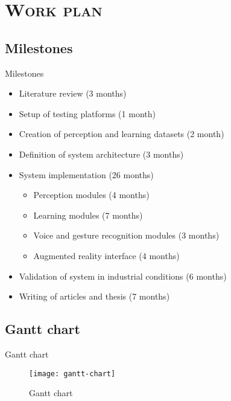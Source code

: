 \section{\scshape Work plan}\label{sec:workplan}

\subsection{Milestones}
\begin{frame}{Milestones}
	\begin{itemize}
		\item Literature review (3 months)
		\item Setup of testing platforms (1 month)
		\item Creation of perception and learning datasets (2 month)
		\item Definition of system architecture (3 months)
		\item System implementation (26 months)
		\begin{itemize}
			\item Perception modules (4 months)
			\item Learning modules (7 months)
			\item Voice and gesture recognition modules (3 months)
			\item Augmented reality interface (4 months)
		\end{itemize}
		\item Validation of system in industrial conditions (6 months)
		\item Writing of articles and thesis (7 months)
	\end{itemize}
\end{frame}

\subsection{Gantt chart}
\begin{frame}{Gantt chart}
	\begin{figure}
		\centering
		\texttt{[image: gantt-chart]}
		\caption{Gantt chart}
	\end{figure}
\end{frame}
